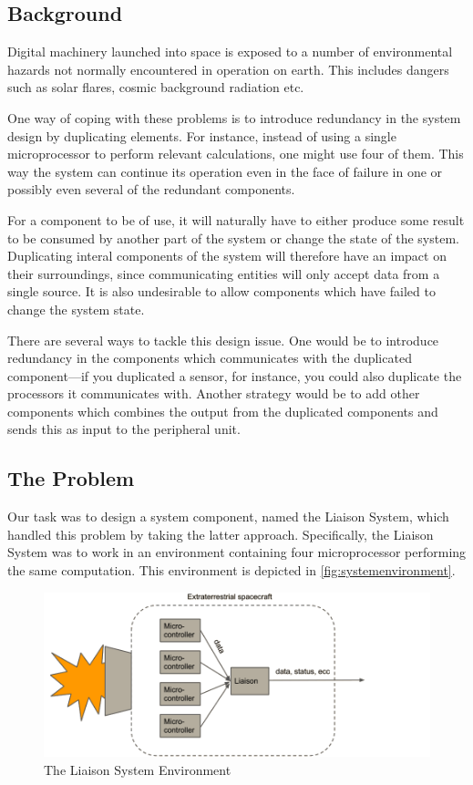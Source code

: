 \subsection{Background}
Digital machinery launched into space is exposed to a number of
environmental hazards not normally encountered in operation on
earth. This includes dangers such as solar flares, cosmic background
radiation etc.\cite{nasa}

One way of coping with these problems is to introduce redundancy in
the system design by duplicating elements. For instance, instead of
using a single microprocessor to perform relevant calculations, one
might use four of them. This way the system can continue its operation
even in the face of failure in one or possibly even several of the
redundant components.

For a component to be of use, it will naturally have to either produce
some result to be consumed by another part of the system or change the
state of the system. Duplicating interal components of the system will
therefore have an impact on their surroundings, since communicating
entities will only accept data from a single source. It is also
undesirable to allow components which have failed to change the system
state.

There are several ways to tackle this design issue. One would be to
introduce redundancy in the components which communicates with the
duplicated component---if you duplicated a sensor, for instance, you
could also duplicate the processors it communicates with. Another
strategy would be to add other components which combines the output
from the duplicated components and sends this as input to the
peripheral unit.

\subsection{The Problem}
\label{sec:problem}
Our task was to design a system component, named the Liaison System,
which handled this problem by taking the latter
approach. Specifically, the Liaison System was to work in an
environment containing four microprocessor performing the same
computation. This environment is depicted in
\autoref{fig:systemenvironment}. 

\begin{figure}[H]
    \includegraphics[width=15cm]{fig_system_env}
    \caption{The Liaison System Environment}
    \label{fig:systemenvironment}
\end{figure}

